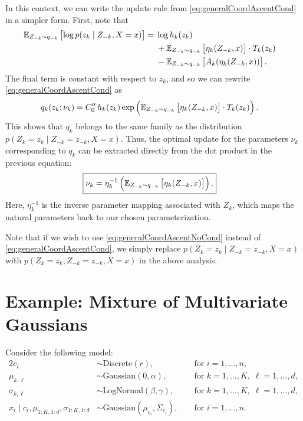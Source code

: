 \documentclass[11pt]{article}
\newcommand{\Discrete}{\mathrm{Discrete}}
\newcommand{\Gaussian}{\mathrm{Gaussian}}
\newcommand{\LogNormal}{\mathrm{LogNormal}}
\begin{document}
In this context, we can write the update rule from \eqref{eq:generalCoordAscentCond} in a simpler form.
First, note that
\begin{align}
\mathbb{E}_{\substack{Z_{-k} \sim q_{-k}}}\left[  \log p(z_k \mid Z_{-k}, X = x)  \right]
&= \begin{aligned}[t]
    &\log h_k(z_k) \\
    &+ \mathbb{E}_{\substack{Z_{-k} \sim q_{-k}}}\left[  \eta_k(Z_{-k}, x)  \right] \cdot T_k(z_k) \\
    &- \mathbb{E}_{\substack{Z_{-k} \sim q_{-k}}}\left[  A_k(\eta_k(Z_{-k}, x))  \right].
    \end{aligned}
\end{align}
The final term is constant with respect to $z_k$, and so we can rewrite \eqref{eq:generalCoordAscentCond} as
\begin{align}
q_k(z_k; \nu_k)
&=
C''_0 \, h_k(z_k) \exp\left( \mathbb{E}_{\substack{Z_{-k} \sim q_{-k}}}\left[ \eta_k(Z_{-k}, x) \right] \cdot T_k(z_k) \right).
\end{align}
This shows that $q_k$ belongs to the same family as the distribution $p(Z_k = z_k \mid Z_{-k} = z_{-k}, X = x)$.
Thus, the optimal update for the parameters $\nu_k$ corresponding to $q_k$ can be extracted directly from the dot product in the previous equation:
\begin{align}
\label{eq:paramUpdate}
\Aboxed{
\nu_k
&=
\eta_k^{-1} \left(
    \expectOver{Z_{-k} \sim q_{-k}}{ \eta_k(Z_{-k}, x) }
\right).
}
\end{align}
Here, $\eta_k^{-1}$ is the inverse parameter mapping associated with $Z_k$, which maps the natural parameters back to our chosen parameterization.

Note that if we wish to use \eqref{eq:generalCoordAscentNoCond} instead of \eqref{eq:generalCoordAscentCond},
we simply replace $p(Z_k = z_k \mid Z_{-k} = z_{-k}, X = x)$ with $p(Z_k = z_k, Z_{-k} = z_{-k}, X = x)$ in the above analysis.

\section{Example: Mixture of Multivariate Gaussians}

Consider the following model:
\begin{alignat}{2}
c_i &\sim \Discrete(r), &&\text{ for } i = 1, \ldots, n, \\
\mu_{k, \ell} &\sim \Gaussian(0, \alpha), &&\text{ for } k = 1, \ldots, K, \; \ell = 1, \ldots, d, \\
\sigma_{k, \ell} &\sim \LogNormal(\beta, \gamma), &&\text{ for } k = 1, \ldots, K, \; \ell = 1, \ldots, d, \\
x_i \mid c_i, \mu_{1:K,1:d}, \sigma_{1:K,1:d} &\sim \Gaussian(\mu_{c_i}, \Sigma_{c_i}), &&\text{ for } i = 1, \ldots, n.
\end{alignat}
\end{document}
